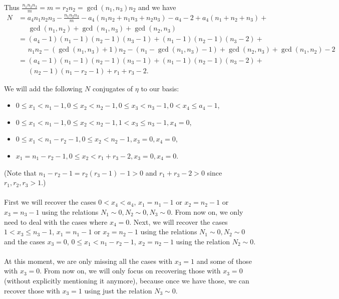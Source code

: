 \documentclass[12pt,a4paper]{article}
\theoremstyle{definition}
\begin{document}
Thus $\frac{n_1n_2n_3}{m}=m=r_2n_2=\gcd(n_1,n_3)n_2$ and we have
\begin{align*}
N&=a_4n_1n_2n_3-\frac{n_1n_2n_3}{m}-a_4(n_1n_2+n_1n_3+n_2n_3)-a_4-2+a_4(n_1+n_2+n_3)+\\
&\phantom{am}\gcd(n_1,n_2)+\gcd(n_1,n_3)+\gcd(n_2,n_3)\\
&=(a_4-1)(n_1-1)(n_2-1)(n_3-1)+(n_1-1)(n_2-1)(n_3-2)+\\
&\phantom{am}n_1n_2-(\gcd(n_1,n_3)+1)n_2-(n_1-\gcd(n_1,n_3)-1)+\gcd(n_2,n_3)+\gcd(n_1,n_2)-2\\
&=(a_4-1)(n_1-1)(n_2-1)(n_3-1)+(n_1-1)(n_2-1)(n_3-2)+\\
&\phantom{am}(n_2-1)(n_1-r_2-1)+r_1+r_3-2.
\end{align*}

We will add the following $N$ conjugates of $\eta$ to our basis:
\begin{itemize}
\item $0\leq x_1<n_1-1, 0\leq x_2<n_2-1, 0\leq x_3<n_3-1, 0<x_4\leq a_4-1$,
\item $0\leq x_1<n_1-1, 0\leq x_2<n_2-1, 1< x_3 \leq n_3-1, x_4=0$,
\item $0\leq x_1< n_1-r_2-1, 0\leq x_2<n_2-1, x_3=0, x_4=0$,
\item           $x_1=n_1-r_2-1, 0\leq x_2<r_1+r_3-2, x_3=0, x_4=0$.
\end{itemize}
(Note that $n_1-r_2-1=r_2(r_3-1)-1> 0$ and $r_1+r_3-2>0$ since $r_1,r_2,r_3>1$.)

\paragraph*{}
First we will recover the cases $0<x_4<a_4$, $x_1=n_1-1$ or $x_2=n_2-1$ or $x_3=n_3-1$ using the relations $N_1\sim 0, N_2\sim 0, N_3\sim 0$. From now on, we only need to deal with the cases where $x_4=0$. Next, we will recover the cases $1< x_3 \leq n_3-1$, $x_1=n_1-1$ or $x_2=n_2-1$ using the relations $N_1\sim 0, N_2\sim 0$ and the cases $x_3=0$, $0\leq x_1< n_1-r_2-1$, $x_2=n_2-1$ using the relation $N_2\sim 0$.
\paragraph*{}
At this moment, we are only missing all the cases with $x_3=1$ and some of those with $x_3=0$. From now on, we will only focus on recovering those with $x_3=0$ (without explicitly mentioning it anymore), because once we have those, we can recover those with $x_3=1$ using just the relation $N_3\sim 0$.
\end{document}
